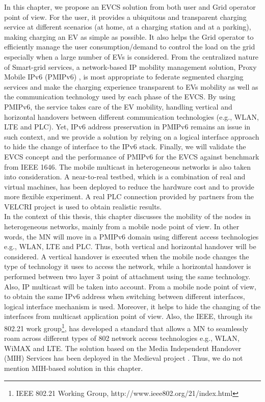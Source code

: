 In this chapter, we propose an EVCS solution from both user and Grid operator point of view. For the user, it provides a ubiquitous and transparent charging service at different scenarios (at home, at a charging station and at a parking), making charging an EV as simple as possible. It also helps the Grid operator to efficiently manage the user consumption/demand to control the load on the grid especially when a large number of EVs is considered. From the centralized nature of Smart-grid services, a network-based IP mobility management solution, Proxy Mobile IPv6 (PMIPv6) \cite{PMIPv6}, is most appropriate to federate segmented charging services and make the charging experience transparent to EVs mobility as well as the communication technology used by each phase of the EVCS. By using PMIPv6, the service takes care of the EV mobility, handling vertical and horizontal handovers between different communication technologies (e.g., WLAN, LTE and PLC). Yet, IPv6 address preservation in PMIPv6 remains an issue in such context, and we provide a solution by relying on a logical interface approach to hide the change of interface to the IPv6 stack. Finally, we will validate the EVCS concept and the performance of PMIPv6 for the EVCS against benchmark from IEEE 1646. The mobile multicast in heterogeneous networks is also taken into consideration. A near-to-real testbed, which is a combination of real and virtual machines, has been deployed to reduce the hardware cost and to provide more flexible experiment. A real PLC connection provided by partners from the VELCRI project is used to obtain realistic results.\\ 

In the context of this thesis, this chapter discusses the mobility of the nodes in heterogeneous networks, mainly from a mobile node point of view. In other words, the MN will move in a PMIPv6 domain using different access technologies e.g., WLAN, LTE and PLC. Thus, both vertical and horizontal handover will be considered. A vertical handover is executed when the mobile node changes the type of technology it uses to access the network, while a horizontal handover is performed between two layer 3 point of attachment using the same technology. Also, IP multicast will be taken into account. From a mobile node point of view, to obtain the same IPv6 address when switching between different interfaces, logical interface mechanism is used. Moreover, it helps to hide the changing of the interfaces from multicast application point of view. Also, the IEEE, through its 802.21 work group\footnote{IEEE 802.21 Working Group, http://www.ieee802.org/21/index.html}, has developed a standard that allows a MN to seamlessly roam across different types of 802 network access technologies e.g., WLAN, WiMAX and LTE. The solution based on the Media Independent Handover (MIH) Services has been deployed in the Medieval project \cite{d4.1}. Thus, we do not mention MIH-based solution in this chapter. 

